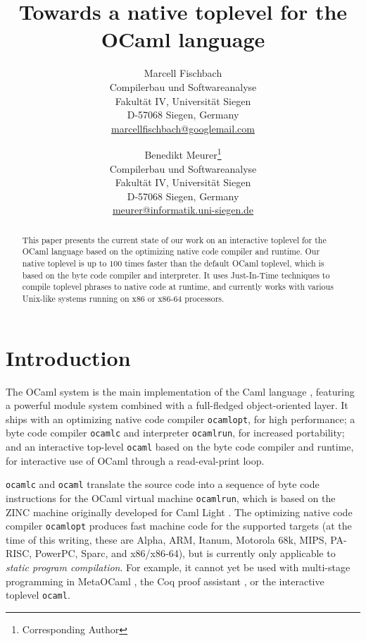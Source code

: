 \documentclass[10pt,a4paper,final,twocolumn]{article}
\begin{document}
\title{%
  Towards a native toplevel for the OCaml language
}
\author{%
  Marcell Fischbach \\
  Compilerbau und Softwareanalyse \\
  Fakult\"at IV, Universit\"at Siegen \\
  D-57068 Siegen, Germany \\
  \url{marcellfischbach@googlemail.com}
  \and
  Benedikt Meurer\thanks{Corresponding Author} \\
  Compilerbau und Softwareanalyse \\
  Fakult\"at IV, Universit\"at Siegen \\
  D-57068 Siegen, Germany \\
  \url{meurer@informatik.uni-siegen.de}
}
\date{}

\maketitle

\begin{abstract}
  This paper presents the current state of our work on an interactive toplevel for the OCaml language
  based on the optimizing native code compiler and runtime. Our native toplevel is up to $100$ times
  faster than the default OCaml toplevel, which is based on the byte code compiler and interpreter.
  It uses Just-In-Time techniques to compile toplevel phrases to native code at runtime, and
  currently works with various Unix-like systems running on x86 or x86-64 processors.
\end{abstract}


\section{Introduction}

The OCaml \cite{Leroy11,Remy02} system is the main implementation of the Caml
language \cite{Caml11}, featuring a powerful module system
combined with a full-fledged object-oriented layer. It ships with an optimizing native
code compiler \texttt{ocamlopt}, for high performance; a byte code compiler \texttt{ocamlc}
and interpreter \texttt{ocamlrun}, for increased portability; and an interactive top-level
\texttt{ocaml} based on the byte code compiler and runtime, for interactive use of OCaml
through a read-eval-print loop.

\texttt{ocamlc} and \texttt{ocaml} translate the source code into a sequence of byte code
instructions for the OCaml virtual machine \texttt{ocamlrun}, which is based on the ZINC
machine \cite{Leroy90} originally developed for Caml Light \cite{Leroy02}. The optimizing
native code compiler \texttt{ocamlopt} produces fast machine code for the supported targets
(at the time of this writing, these are Alpha, ARM, Itanum, Motorola 68k, MIPS, PA-RISC, PowerPC,
Sparc, and x86/x86-64), but is currently only applicable to \emph{static program compilation}.
For example, it cannot yet be used with multi-stage programming in MetaOCaml \cite{Taha03,Taha06},
the Coq proof assistant \cite{Bertot04,Coq10}, or the interactive toplevel \texttt{ocaml}.
\end{document}
